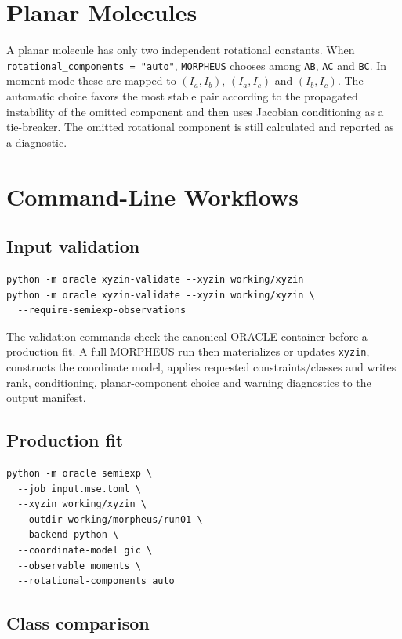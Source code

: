 \documentclass[11pt]{article}
\newcommand{\program}{\texttt{MORPHEUS}}
\newcommand{\xyzin}{\texttt{xyzin}}
\begin{document}
\section{Planar Molecules}

A planar molecule has only two independent rotational constants.  When
\texttt{rotational\_components = "auto"}, \program{} chooses among
\texttt{AB}, \texttt{AC} and \texttt{BC}.  In moment mode these are mapped to
\((I_a,I_b)\), \((I_a,I_c)\) and \((I_b,I_c)\).  The automatic choice favors
the most stable pair according to the propagated instability of the omitted
component and then uses Jacobian conditioning as a tie-breaker.  The omitted
rotational component is still calculated and reported as a diagnostic.

\section{Command-Line Workflows}

\subsection{Input validation}

\begin{lstlisting}[style=oracle]
python -m oracle xyzin-validate --xyzin working/xyzin
python -m oracle xyzin-validate --xyzin working/xyzin \
  --require-semiexp-observations
\end{lstlisting}

\noindent
The validation commands check the canonical ORACLE container before a
production fit.  A full MORPHEUS run then materializes or updates \xyzin{},
constructs the coordinate model, applies requested constraints/classes and
writes rank, conditioning, planar-component choice and warning diagnostics to
the output manifest.

\subsection{Production fit}

\begin{lstlisting}[style=oracle]
python -m oracle semiexp \
  --job input.mse.toml \
  --xyzin working/xyzin \
  --outdir working/morpheus/run01 \
  --backend python \
  --coordinate-model gic \
  --observable moments \
  --rotational-components auto
\end{lstlisting}

\subsection{Class comparison}
\end{document}
